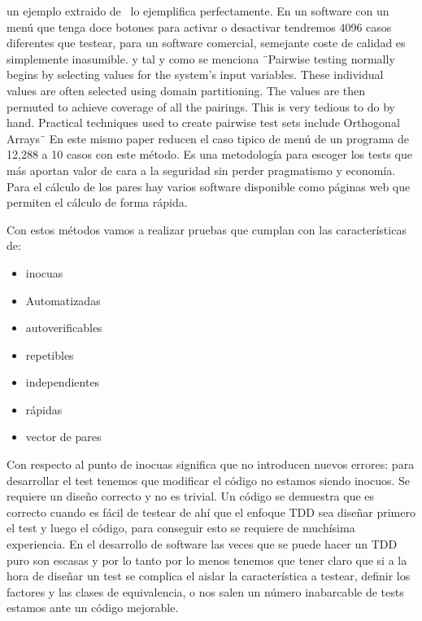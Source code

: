 un ejemplo extraido de~\cite{Bach04pairwisetesting} lo ejemplifica perfectamente. En un software con un menú que tenga doce botones para activar o desactivar tendremos 4096 casos diferentes que testear, para un software comercial, semejante coste de calidad es simplemente inasumible. y tal y como se menciona ¨Pairwise testing normally begins by selecting values for the system’s input variables. These individual values are often selected using domain partitioning. The values are then permuted to achieve coverage of all the pairings. This is very tedious to do by hand. Practical techniques used to create pairwise test sets include Orthogonal Arrays¨\cite{Bach04pairwisetesting} En este mismo paper reducen el caso tipico de menú de un programa de 12,288 a 10 casos con este método. Es una metodología para escoger los tests que más aportan valor de cara a la seguridad sin perder pragmatismo y economía. Para el cálculo de los pares hay varios software disponible como páginas web que permiten el cálculo de forma rápida.

Con estos métodos vamos a realizar pruebas que cumplan con las características de:

\begin{itemize}
    \item inocuas
    \item Automatizadas
    \item autoverificables
    \item repetibles
    \item independientes
    \item rápidas
    \item vector de pares
\end{itemize}

Con respecto al punto de inocuas significa que no introducen nuevos errores: para desarrollar el test tenemos que modificar el código no estamos siendo inocuos. Se requiere un diseño correcto y no es trivial. Un código se demuestra que es correcto cuando es fácil de testear de ahí que el enfoque TDD sea diseñar primero el test y luego el código, para conseguir esto se requiere de muchísima experiencia. En el desarrollo de software las veces que se puede hacer un TDD puro son escasas y por lo tanto por lo menos tenemos que tener claro que si a la hora de diseñar un test se complica el aislar la característica a testear, definir los factores y las clases de equivalencia, o nos salen un número inabarcable de tests estamos ante un código mejorable.